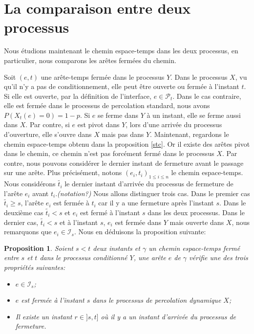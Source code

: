 \documentclass[titlepage,a4paper,12pt]{article}
\newcounter{prop}
\newtheorem{propo}[prop]{Proposition}
\begin{document}
\section{La comparaison entre deux processus}
Nous étudions maintenant le chemin espace-temps dans les deux processus, en particulier, nous comparons les arêtes fermées du chemin.

Soit $(e,t)$ une arête-temps fermée dans le processus $Y$. Dans le processus $X$, vu qu'il n'y a pas de conditionnement, elle peut être ouverte ou fermée à l'instant $t$. Si elle est ouverte, par la définition de l'interface, $e\in \mathcal{P}_t$. Dans le cas contraire, elle est fermée dans le processus de percolation standard, nous avons $P(X_t(e) = 0) = 1-p$. Si $e$ se ferme dans $Y$ à un instant, elle se ferme aussi dans $X$. Par contre, si $e$ est pivot dans $Y$, lors d'une arrivée du processus d'ouverture, elle s'ouvre dans $X$ mais pas dans $Y$. Maintenant, regardons le chemin espace-temps obtenu dans la proposition \ref{stc}. Or il existe des arêtes pivot dans le chemin, ce chemin n'est pas forcément fermé dans le processus $X$. Par contre, nous pouvons considérer le dernier instant de fermeture avant le passage sur une arête. Plus précisément, notons $(e_i,t_i)_{1\leqslant i \leqslant n}$ le chemin espace-temps. Nous considérons $\tilde{t_i}$ le dernier instant d'arrivée du processus de fermeture de l'arête $e_i$ avant $t_i$.\emph{\color{blue}(notation?)} Nous allons distinguer trois cas. Dans le premier cas $\tilde{t_i}\geqslant s$, l'arête $e_i$ est fermée à $t_i$ car il y a une fermeture après l'instant $s$. Dans le deuxième cas $\tilde{t_i}< s$ et $e_i$ est fermé à l'instant $s$ dans les deux processus. Dans le dernier cas, $\tilde{t_i}< s$ et à l'instant $s$, $e_i$ est fermée dans $Y$ mais ouverte dans $X$, nous remarquons que $e_i \in \mathcal{I}_s$. Nous en déduisons la proposition suivante:

\begin{propo}\label{couple} Soient $s<t$ deux instants et $\gamma$ un chemin espace-temps fermé entre $s$ et $t$ dans le processus conditionné $Y$, une arête $e$ de $\gamma$ vérifie une des trois propriétés suivantes:
\begin{itemize}[leftmargin = 0.9cm]
\item[(A)] $e\in \mathcal{I}_s$;
\item[(B)] $e$ est fermée à l'instant $s$ dans le processus de percolation dynamique $X$;
\item[(C)] Il existe un instant $r\in ]s,t]$ où il y a un instant d'arrivée du processus de fermeture.
\end{itemize}
\end{propo}
\end{document}

